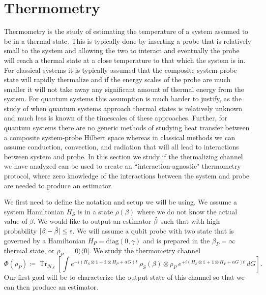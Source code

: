 \documentclass{article}
\newcommand{\ketbra}[2]{| #1\rangle\! \langle #2|}
\newcommand{\brackets}[1]{\left[ #1 \right]}
\DeclareMathOperator{\Tr}{Tr}
\newcommand{\partrace}[2]{\Tr_{#1} \brackets{ #2 }}
\newcommand{\hilb}{\mathcal{H}}
\newcommand{\identity}{\mathds{1}}
\begin{document}
\section{Thermometry}
Thermometry is the study of estimating the temperature of a system assumed to be in a thermal state. This is typically done by inserting a probe that is relatively small to the system and allowing the two to interact and eventually the probe will reach a thermal state at a close temperature to that which the system is in. For classical systems it is typically assumed that the composite system-probe state will rapidly thermalize and if the energy scales of the probe are much smaller it will not take away any significant amount of thermal energy from the system. For quantum systems this assumption is much harder to justify, as the study of when quantum systems approach thermal states is relatively unknown and much less is known of the timescales of these approaches. Further, for quantum systems there are no generic methods of studying heat transfer between a composite system-probe Hilbert space whereas in classical methods we can assume conduction, convection, and radiation that will all lead to interactions between system and probe. In this section we study if the thermalizing channel we have analyzed can be used to create an ``interaction-agnostic" thermometry protocol, where zero knowledge of the interactions between the system and probe are needed to produce an estimator. 

We first need to define the notation and setup we will be using. We assume a system Hamiltonian $H_S$ is in a state $\rho(\beta)$ where we do not know the actual value of $\beta$. We would like to output an estimator $\Hat{\beta}$ such that with high probability $|\beta - \Hat{\beta}| \le \epsilon$. We will assume a qubit probe with two state that is governed by a Hamiltonian $H_P = \text{diag}(0, \gamma)$ and is prepared in the $\beta_P = \infty$ thermal state, or $\rho_P = \ketbra{0}{0}$. We study the thermometry channel
\begin{equation}
    \Phi(\rho_P) \coloneqq \partrace{\hilb_S}{\int e^{-i (H_S \otimes \identity + \identity \otimes H_P + \alpha G) t} ~\rho_S(\beta) \otimes \rho_P ~ e^{+i (H_S \otimes \identity + \identity \otimes H_P + \alpha G) t} ~dG}.
\end{equation}
Our first goal will be to characterize the output state of this channel so that we can then produce an estimator.
\end{document}
